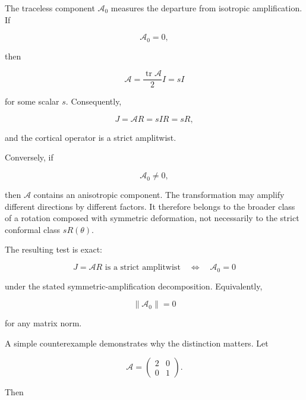 \documentclass[11pt]{article}
\begin{document}
The traceless component $\mathcal A_0$ measures the departure from isotropic amplification. If

\begin{equation}
\mathcal A_0=0,
\end{equation}

then

\begin{equation}
\mathcal A
=
\frac{\operatorname{tr}\mathcal A}{2}I
=
sI
\end{equation}

for some scalar $s$. Consequently,

\begin{equation}
J
=
\mathcal A R
=
sIR
=
sR,
\end{equation}

and the cortical operator is a strict amplitwist.

Conversely, if

\begin{equation}
\mathcal A_0\neq0,
\end{equation}

then $\mathcal A$ contains an anisotropic component. The transformation may amplify different directions by different factors. It therefore belongs to the broader class of a rotation composed with symmetric deformation, not necessarily to the strict conformal class $sR(\theta)$.

The resulting test is exact:

\begin{equation}
\boxed{
J=\mathcal A R
\text{ is a strict amplitwist}
\quad\Longleftrightarrow\quad
\mathcal A_0=0
}
\end{equation}

under the stated symmetric-amplification decomposition. Equivalently,

\begin{equation}
\boxed{
\|\mathcal A_0\|=0
}
\end{equation}

for any matrix norm.

A simple counterexample demonstrates why the distinction matters. Let

\begin{equation}
\mathcal A
=
\begin{pmatrix}
2&0\\
0&1
\end{pmatrix}.
\end{equation}

Then
\end{document}
